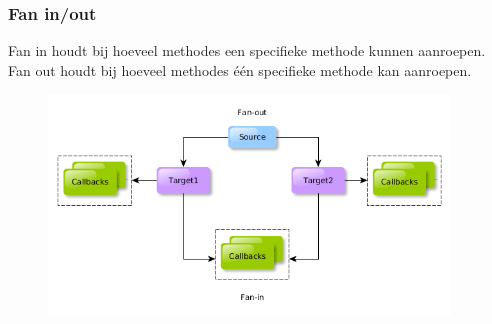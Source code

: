 \subsubsection{Fan in/out}
Fan in houdt bij hoeveel methodes een specifieke methode kunnen aanroepen.
Fan out houdt bij hoeveel methodes één specifieke methode kan aanroepen.
\begin{figure}[H]
	\centering
	\includegraphics[width=0.95\textwidth]{img/fan-out-fan-in.png}
	\label{fig:faninout}
\end{figure}